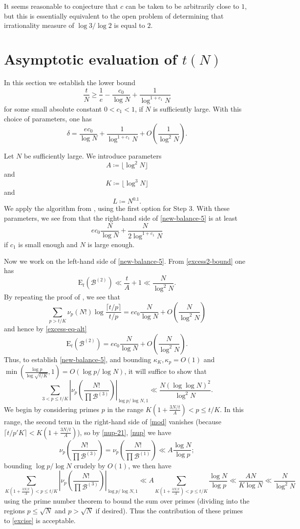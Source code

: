 \documentclass[12pt,a4paper,reqno]{amsart}
\numberwithin{equation}{section}
\theoremstyle{plain}
\theoremstyle{definition}
\newcommand\tuple{{\mathcal B}}
\newcommand\excess{{\mathrm{E}}}
\begin{document}
It seems reasonable to conjecture that $c$ can be taken to be arbitrarily close to $1$, but this is essentially equivalent to the open problem of determining that irrationality measure of $\log 3 / \log 2$ is equal to $2$.


\section{Asymptotic evaluation of $t(N)$}

In this section we establish the lower bound
$$ \frac{t}{N} \geq \frac{1}{e} - \frac{c_0}{\log N} + \frac{1}{\log^{1+c_1} N}$$
for some small absolute constant $0 < c_1 < 1$, if $N$ is sufficiently large.  With this choice of parameters, one has
$$ \delta = \frac{ec_0}{\log N} + \frac{1}{\log^{1+c_1} N} + O\left( \frac{1}{\log^2 N} \right).$$

Let $N$ be sufficiently large.  We introduce parameters
$$ A \coloneqq \lfloor \log^2 N \rfloor$$
and
$$ K \coloneqq \lfloor \log^3 N \rfloor$$
and
$$ L \coloneqq N^{0.1}.$$
We apply the algorithm from , using the first option for Step 3.  With these parameters, we see from  that the right-hand side of \eqref{new-balance-5} is at least
$$ ec_0 \frac{N}{\log N} + \frac{N}{2 \log^{1+c_1} N}$$
if $c_1$ is small enough and $N$ is large enough.  

Now we work on the left-hand side of \eqref{new-balance-5}.  From \eqref{excess2-bound} one has
$$ \excess_t(\tuple^{(2)}) \ll \frac{t}{A} + 1\ll \frac{N}{\log^2 N}.$$
By repeating the proof of , we see that
$$ \sum_{p > t/K} \nu_p(N!) \log \frac{\lceil t/p \rceil}{t/p} = ec_0 \frac{N}{\log N} + O\left( \frac{N}{\log^2 N} \right)$$
and hence by \eqref{excess-eq-alt}
$$ \excess_t(\tuple^{(2)}) = ec_0 \frac{N}{\log N} + O\left( \frac{N}{\log^2 N} \right).$$
Thus, to establish \eqref{new-balance-5}, and bounding $\kappa_K, \kappa_p = O(1)$ and $\min(\frac{\log p}{\log\sqrt{t/K}},1) = O(\log p/\log N)$, it will suffice to show that
\begin{equation}\label{excise}
\sum_{3 < p \leq t/K} \left|\nu_p\left(\frac{N!}{\prod \tuple^{(3)}}\right)\right|_{\log p/\log N,1} \ll \frac{N (\log\log N)^2}{\log^2 N}.
\end{equation}
We begin by considering primes $p$ in the range $K(1+\frac{3N/t}{A}) < p \leq t/K$.  In this range, the second term in the right-hand side of \eqref{mod} vanishes (because $\lceil t/p' K \rceil < K(1+\frac{3N/t}{A})$), so by \eqref{nup-21}, \eqref{nup} we have
$$
\nu_p\left(\frac{N!}{\prod \tuple^{(3)}}\right) =
\nu_p\left(\frac{N!}{\prod \tuple^{(1)}}\right)
\ll A \frac{\log N}{\log p};$$
bounding $\log p/\log N$ crudely by $O(1)$, we then have
$$
\sum_{K(1+\frac{3N/t}{A}) < p \leq t/K}
\left|\nu_p\left(\frac{N!}{\prod \tuple^{(3)}}\right)\right|_{\log p/\log N,1}
\ll A \sum_{K(1+\frac{3N/t}{A}) < p \leq t/K} \frac{\log N}{\log p} \ll \frac{AN}{K\log N} \ll \frac{N}{\log^2 N}$$
using the prime number theorem to bound the sum over primes (dividing into the regions $p \leq \sqrt{N}$ and $p > \sqrt{N}$ if desired).  Thus the contribution of these primes to \eqref{excise} is acceptable.
\end{document}
